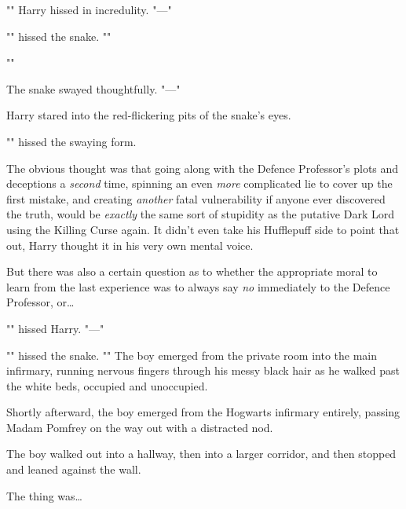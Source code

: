 "" Harry hissed in incredulity. "—"

"" hissed
the snake. ""

""

The snake swayed thoughtfully. "—"

Harry stared into the red-flickering pits of the snake’s eyes.

"" hissed the swaying form.

The obvious thought was that going along with the Defence Professor’s plots and
deceptions a \emph{second} time, spinning an even \emph{more} complicated lie
to cover up the first mistake, and creating \emph{another} fatal vulnerability
if anyone ever discovered the truth, would be \emph{exactly} the same sort of
stupidity as the putative Dark Lord using the Killing Curse again. It didn’t
even take his Hufflepuff side to point that out, Harry thought it in his very
own mental voice.

But there was also a certain question as to whether the appropriate moral to
learn from the last experience was to always say \emph{no} immediately to the
Defence Professor, or…

"" hissed Harry. "—"

"" hissed the snake. ""
\later
The boy emerged from the private room into the main infirmary, running nervous
fingers through his messy black hair as he walked past the white beds, occupied
and unoccupied.

Shortly afterward, the boy emerged from the Hogwarts infirmary entirely,
passing Madam Pomfrey on the way out with a distracted nod.

The boy walked out into a hallway, then into a larger corridor, and then
stopped and leaned against the wall.

The thing was…

